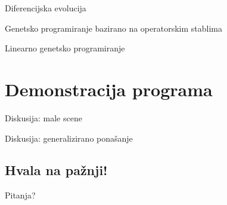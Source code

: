 \documentclass{beamer}
\begin{document}
  \begin{frame}{Diferencijska evolucija}
  \end{frame}

  \begin{frame}{Genetsko programiranje bazirano na operatorskim stablima}
  \end{frame}

  \begin{frame}{Linearno genetsko programiranje}
  \end{frame}

  \section*{Demonstracija programa}

  \begin{frame}{Diskusija: male scene}
  \end{frame}

  \begin{frame}{Diskusija: generalizirano ponašanje}
  \end{frame}
  
  \begin{frame}[plain]
  	\section*{Hvala na pažnji!}
  	\hspace{15em}Pitanja?
  \end{frame}
  
\end{document}
